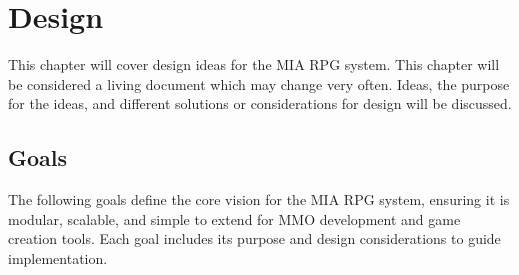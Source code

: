 \chapter{Design}\label{ch:design}
\pagestyle{fancy}

This chapter will cover design ideas for the MIA RPG system. This chapter will be considered a living document which may change very often. Ideas, the purpose for the ideas, and different solutions or considerations for design will be discussed.













\section{Goals}

The following goals define the core vision for the MIA RPG system, ensuring it is modular, scalable, and simple to extend for MMO development and game creation tools. Each goal includes its purpose and design considerations to guide implementation.

